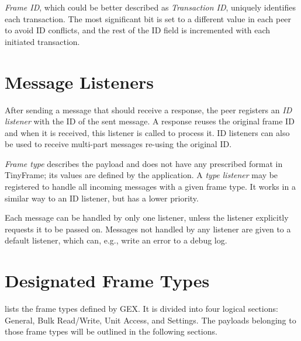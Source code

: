 \textit{Frame ID}, which could be better described as \textit{Transaction ID}, uniquely identifies each transaction. The most significant bit is set to a different value in each peer to avoid ID conflicts, and the rest of the ID field is incremented with each initiated transaction.

\section{Message Listeners} \label{sec:tf_listeners}

After sending a message that should receive a response, the peer registers an \textit{ID listener} with the ID of the sent message. A response reuses the original frame ID and when it is received, this listener is called to process it. ID listeners can also be used to receive multi-part messages re-using the original ID.

\textit{Frame type} describes the payload and does not have any prescribed format in TinyFrame; its values are defined by the application. A \textit{type listener} may be registered to handle all incoming messages with a given frame type. It works in a similar way to an ID listener, but has a lower priority.

Each message can be handled by only one listener, unless the listener explicitly requests it to be passed on. Messages not handled by any listener are given to a default listener, which can, e.g., write an error to a debug log.

\section{Designated Frame Types}

 lists the frame types defined by GEX. It is divided into four logical sections: General, Bulk Read/Write, Unit Access, and Settings. The payloads belonging to those frame types will be outlined in the following sections.

